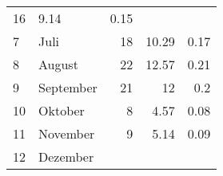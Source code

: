 \begin{longtable}{lXrrr}
       \num{16} &
       \num[round-mode=places,round-precision=2]{9.14} &
         \num[round-mode=places,round-precision=2]{0.15} \\

     7 &
     \multicolumn{1}{X}{ Juli   } &


       \num{18} &
       \num[round-mode=places,round-precision=2]{10.29} &
         \num[round-mode=places,round-precision=2]{0.17} \\

     8 &
     \multicolumn{1}{X}{ August   } &


       \num{22} &
       \num[round-mode=places,round-precision=2]{12.57} &
         \num[round-mode=places,round-precision=2]{0.21} \\

     9 &
     \multicolumn{1}{X}{ September   } &


       \num{21} &
       \num[round-mode=places,round-precision=2]{12} &
         \num[round-mode=places,round-precision=2]{0.2} \\

     10 &
     \multicolumn{1}{X}{ Oktober   } &


       \num{8} &
       \num[round-mode=places,round-precision=2]{4.57} &
         \num[round-mode=places,round-precision=2]{0.08} \\

     11 &
     \multicolumn{1}{X}{ November   } &


       \num{9} &
       \num[round-mode=places,round-precision=2]{5.14} &
         \num[round-mode=places,round-precision=2]{0.09} \\

     12 &
     \multicolumn{1}{X}{ Dezember   } &



\end{longtable}
